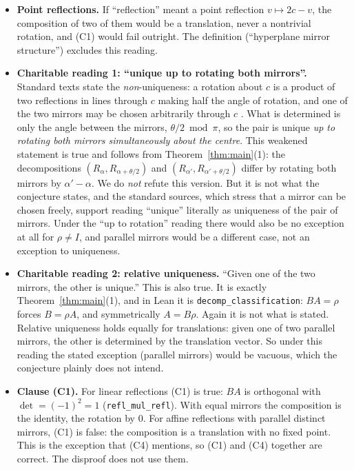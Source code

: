 \documentclass[11pt]{article}
\theoremstyle{definition}
\theoremstyle{remark}
\newcommand{\R}{\mathbb R}
\begin{document}
\begin{itemize}
runs over the decompositions of $\rho|_\Pi$ in Theorem~\ref{thm:main}. Again there is a circle's
worth. In Lean, \texttt{r3\_two\_decompositions} embeds the $90^\circ$ example block-diagonally in
$\R^3$. There the mirrors are the planes $y=0$, $x=y$, $x=0$ and $x=-y$, each containing the
$z$-axis, and they are pairwise different. Parallel hyperplanes through the origin are equal,
so the exception again never applies.
\item \textbf{Point reflections.} If ``reflection'' meant a point reflection $v\mapsto2c-v$, the
composition of two of them would be a translation, never a nontrivial rotation, and (C1) would
fail outright. The definition (``hyperplane mirror structure'') excludes this reading.
\item \textbf{Charitable reading 1: ``unique up to rotating both mirrors''.} Standard texts
state the \emph{non}-uniqueness: a rotation about $c$ is a product of two reflections in
lines through $c$ making half the angle of rotation, and one of the two mirrors may be chosen
arbitrarily through $c$ \cite{coxeter,beg}. What is determined is only the angle between the
mirrors, $\theta/2\bmod\pi$, so the pair is unique \emph{up to rotating both mirrors
simultaneously about the centre}. This weakened statement is true and follows from
Theorem~\ref{thm:main}(1): the decompositions $(R_\alpha,R_{\alpha+\theta/2})$ and
$(R_{\alpha'},R_{\alpha'+\theta/2})$ differ by rotating both mirrors by $\alpha'-\alpha$. We do
\emph{not} refute this version. But it is not what the conjecture states, and the standard
sources, which stress that a mirror can be chosen freely, support reading ``unique'' literally
as uniqueness of the pair of mirrors. Under the ``up to rotation'' reading there would also be
no exception at all for $\rho\neq I$, and parallel mirrors would be a different case, not an
exception to uniqueness.
\item \textbf{Charitable reading 2: relative uniqueness.} ``Given one of the two mirrors, the
other is unique.'' This is also true. It is exactly Theorem~\ref{thm:main}(1), and in Lean it is
\texttt{decomp\_classification}: $BA=\rho$ forces $B=\rho A$, and symmetrically $A=B\rho$. Again
it is not what is stated. Relative uniqueness holds equally for translations: given one of two
parallel mirrors, the other is determined by the translation vector. So under this reading the
stated exception (parallel mirrors) would be vacuous, which the conjecture plainly does not
intend.
\item \textbf{Clause (C1).} For linear reflections (C1) is true: $BA$ is orthogonal with
$\det=(-1)^2=1$ (\texttt{refl\_mul\_refl}). With equal mirrors the composition is the
identity, the rotation by $0$. For affine reflections with parallel distinct mirrors, (C1) is
false: the composition is a translation with no fixed point. This is the exception that (C4)
mentions, so (C1) and (C4) together are correct. The disproof does not use them.
\end{itemize}
\end{document}
